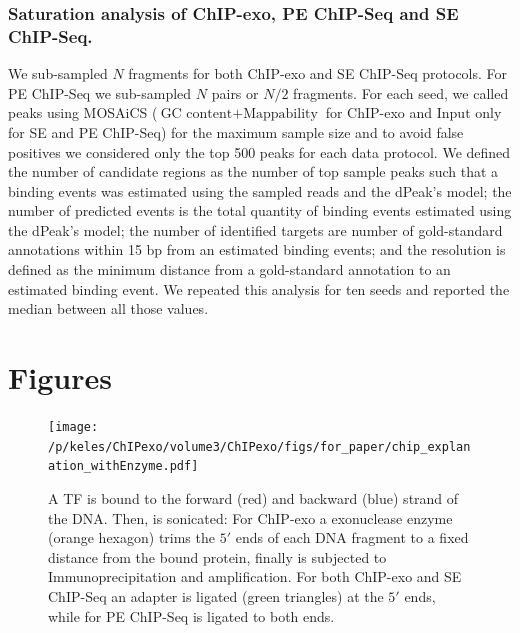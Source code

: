 \documentclass{bmcart}\usepackage[]{graphicx}\usepackage[]{color}
\begin{document}
\subsubsection*{Saturation analysis of ChIP-exo, PE ChIP-Seq and SE ChIP-Seq.}

We sub-sampled $N$ fragments for both ChIP-exo and SE ChIP-Seq
protocols. For PE ChIP-Seq we sub-sampled $N$ pairs or $N/2$
fragments. For each seed, we called peaks using MOSAiCS \cite{mosaics}
($\mbox{GC content} + \mbox{Mappability}$ for ChIP-exo and
$\mbox{Input only}$ for SE and PE ChIP-Seq) for the maximum sample
size and to avoid false positives we considered only the top 500 peaks
for each data protocol. We defined the number of candidate regions as
the number of top sample peaks such that a binding events was
estimated using the sampled reads and the dPeak's model; the number of
predicted events is the total quantity of binding events estimated
using the dPeak's model; the number of identified targets are number
of gold-standard annotations within 15 bp from an estimated
binding events; and the resolution is defined as the minimum distance
from a gold-standard annotation to an estimated binding event. We
repeated this analysis for ten seeds and reported the median between
all those values.



\nocite{exo_gb}
\nocite{maplot1}
\nocite{maplot2}
\nocite{chipbeyond}



\newpage

\section{Figures}

\begin{figure}[h!]
  \centering
  \texttt{[image: /p/keles/ChIPexo/volume3/ChIPexo/figs/for\_paper/chip\_explanation\_withEnzyme.pdf]}
  \caption{A TF is bound to the forward (red) and backward (blue)
    strand of the DNA. Then, is sonicated: For ChIP-exo a exonuclease
    enzyme (orange hexagon) trims the $5\prime$ ends of each DNA
    fragment to a fixed distance from the bound protein, finally is
    subjected to Immunoprecipitation and amplification. For both
    ChIP-exo and SE ChIP-Seq an adapter is ligated (green triangles)
    at the $5\prime$ ends, while for PE ChIP-Seq is ligated to both
    ends.}
  \label{fig:chip_diagram}
\end{figure}
\newpage
\end{document}
